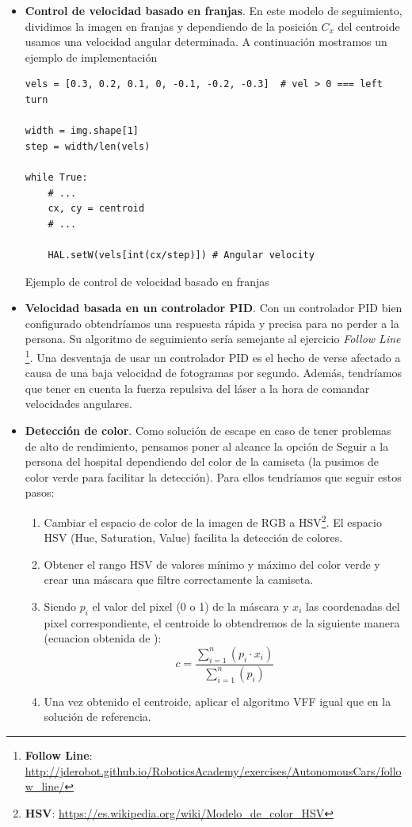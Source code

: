 \begin{itemize}
	\item \textbf{Control de velocidad basado en franjas}. En este modelo de seguimiento, dividimos la imagen en franjas y dependiendo de la posición $C_{x}$ del centroide usamos una velocidad angular determinada. A continuación mostramos un ejemplo de implementación
\begin{code}[H]
\begin{lstlisting}
vels = [0.3, 0.2, 0.1, 0, -0.1, -0.2, -0.3]	 # vel > 0 === left turn

width = img.shape[1]
step = width/len(vels)

while True:
	# ...
	cx, cy = centroid
	# ...
	
	HAL.setW(vels[int(cx/step)]) # Angular velocity
\end{lstlisting}
\caption{Ejemplo de control de velocidad basado en franjas}
\label{cod:vel_bar}
\end{code}
	\item \textbf{Velocidad basada en un controlador PID}. Con un controlador PID bien configurado obtendríamos una respuesta rápida y precisa para no perder a la persona. Su algoritmo de seguimiento sería semejante al ejercicio \textit{Follow Line} \footnote{\textbf{Follow Line}: \url{http://jderobot.github.io/RoboticsAcademy/exercises/AutonomousCars/follow_line/}}. Una desventaja de usar un controlador PID es el hecho de verse afectado a causa de una baja velocidad de fotogramas por segundo. Además, tendríamos que tener en cuenta la fuerza repulsiva del láser a la hora de comandar velocidades angulares.
	\item \textbf{Detección de color}. Como solución de escape en caso de tener problemas de alto de rendimiento, pensamos poner al alcance la opción de Seguir a la persona del hospital dependiendo del color de la camiseta (la pusimos de color verde para facilitar la detección). Para ellos tendríamos que seguir estos pasos:
	\begin{enumerate}
		\item Cambiar el espacio de color de la imagen de RGB a HSV\footnote{\textbf{HSV}: \url{https://es.wikipedia.org/wiki/Modelo_de_color_HSV}}. El espacio HSV (Hue, Saturation, Value) facilita la detección de colores.
		\item Obtener el rango HSV de valores mínimo y máximo del color verde y crear una máscara que filtre correctamente la camiseta.
		\item Siendo $p_{i}$ el valor del pixel (0 o 1) de la máscara y $x_i$ las coordenadas del pixel correspondiente, el centroide lo obtendremos de la siguiente manera (ecuacion obtenida de \cite{centroide_ecuacion}):
		\begin{equation*}
		c = \frac{\sum_{i=1}^n\left(p_i \cdot x_i\right)}{\sum_{i=1}^n\left(p_i\right)}
		\end{equation*}
		\item Una vez obtenido el centroide, aplicar el algoritmo VFF igual que en la solución de referencia.
	\end{enumerate}
\end{itemize}
